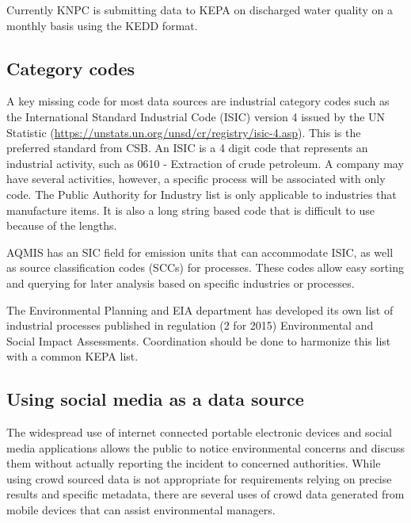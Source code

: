 Currently KNPC is submitting data to KEPA on discharged water quality on a monthly basis using the KEDD format.

\subsection{Category codes}

A key missing code for most data sources are industrial category codes such as the International Standard Industrial Code (ISIC) version 4 issued by the UN Statistic (\url{https://unstats.un.org/unsd/cr/registry/isic-4.asp}). This is the preferred standard from CSB. An ISIC is a 4 digit code that represents an industrial activity, such as 0610 - Extraction of crude petroleum. A company may have several activities, however, a specific process will be associated with only code. The Public Authority for Industry list is only applicable to industries that manufacture items. It is also a long string based code that is difficult to use because of the lengths.

AQMIS has an SIC field for emission units that can accommodate ISIC, as well as source classification codes (SCCs) for processes. These codes allow easy sorting and querying for later analysis based on specific industries or processes.

The Environmental Planning and EIA department has developed its own list of industrial processes published in regulation (2 for 2015) Environmental and Social Impact Assessments. Coordination should be done to harmonize this list with a common KEPA list.

\subsection{Using social media as a data source}

The widespread use of internet connected portable electronic devices and social media applications allows the public to notice environmental concerns and discuss them without actually  reporting the incident to concerned authorities. While using crowd sourced data is not appropriate for requirements relying on precise results and specific metadata, there are several uses of crowd data generated from mobile devices that can assist environmental managers. 

